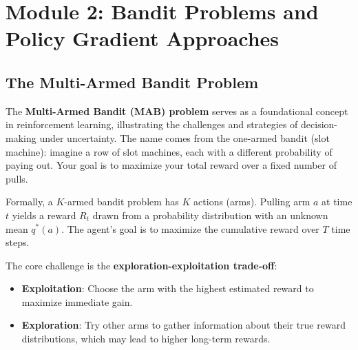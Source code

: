 \documentclass[11pt,a4paper]{article}
\begin{document}
\section{Module 2: Bandit Problems and Policy Gradient Approaches}

\subsection{The Multi-Armed Bandit Problem}

The \textbf{Multi-Armed Bandit (MAB) problem} serves as a foundational concept in reinforcement learning, illustrating the challenges and strategies of decision-making under uncertainty. The name comes from the one-armed bandit (slot machine): imagine a row of slot machines, each with a different probability of paying out. Your goal is to maximize your total reward over a fixed number of pulls.

Formally, a $K$-armed bandit problem has $K$ actions (arms). Pulling arm $a$ at time $t$ yields a reward $R_t$ drawn from a probability distribution with an unknown mean $q^*(a)$. The agent's goal is to maximize the cumulative reward over $T$ time steps.

The core challenge is the \textbf{exploration-exploitation trade-off}:
\begin{itemize}
    \item \textbf{Exploitation}: Choose the arm with the highest estimated reward to maximize immediate gain.
    \item \textbf{Exploration}: Try other arms to gather information about their true reward distributions, which may lead to higher long-term rewards.
\end{itemize}
\end{document}
